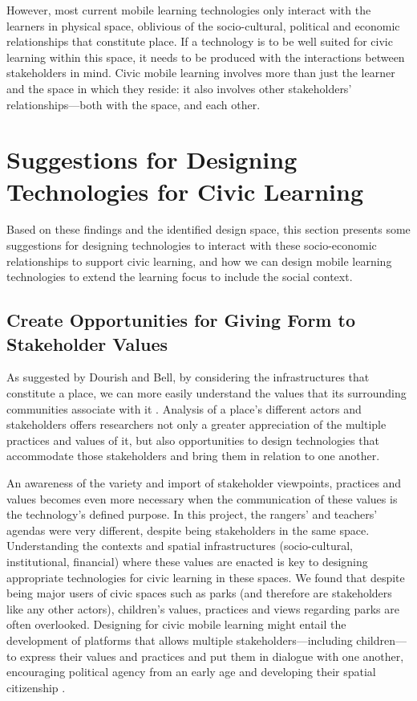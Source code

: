 However, most current mobile learning technologies only interact with the learners in physical space, oblivious of the socio-cultural, political and economic relationships that constitute place. If a technology is to be well suited for civic learning within this space, it needs to be produced with the interactions between stakeholders in mind. Civic mobile learning involves more than just the learner and the space in which they reside: it also involves other stakeholders' relationships---both with the space, and each other.

\section{Suggestions for Designing Technologies for Civic Learning}
\label{sec:SuggestionsCivicLearning}

Based on these findings and the identified design space, this section presents some suggestions for designing technologies to interact with these socio-economic relationships to support civic learning, and how we can design mobile learning technologies to extend the learning focus to include the social context.

\subsection{Create Opportunities for Giving Form to Stakeholder Values}

As suggested by Dourish and Bell, by considering the infrastructures that constitute a place, we can more easily understand the values that its surrounding communities associate with it \citep{Dourish2007}. Analysis of a place's different actors and stakeholders offers researchers not only a greater appreciation of the multiple practices and values of it, but also opportunities to design technologies that accommodate those stakeholders and bring them in relation to one another.

An awareness of the variety and import of stakeholder viewpoints, practices and values becomes even more necessary when the communication of these values is the technology’s defined purpose. In this project, the rangers' and teachers' agendas were very different, despite being stakeholders in the same space. Understanding the contexts and spatial infrastructures (socio-cultural, institutional, financial) where these values are enacted is key to designing appropriate technologies for civic learning in these spaces. We found that despite being major users of civic spaces such as parks (and therefore are stakeholders like any other actors), children’s values, practices and views regarding parks are often overlooked. Designing for civic mobile learning might entail the development of platforms that allows multiple stakeholders---including children---to express their values and practices and put them in dialogue with one another, encouraging political agency from an early age and developing their spatial citizenship \citep{Gryl2012}.

